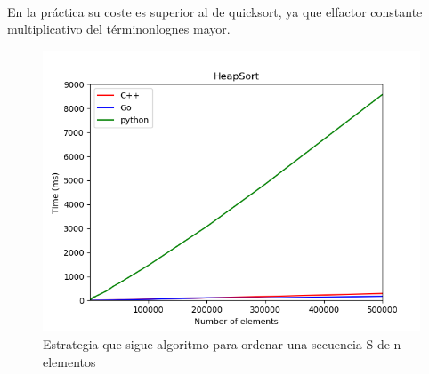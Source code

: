 \documentclass{article}
\begin{document}
        \paragraph {}
        En la práctica su coste es superior al de quicksort, ya que elfactor constante multiplicativo del términonlognes mayor.

            \begin{figure}[h!]
            \centering
            \includegraphics[width=12cm]{img/HeapSort_1.png}
            \caption{Estrategia que sigue algoritmo para ordenar una secuencia S de n elementos}
            \label{fig:heapsort}
        \end {figure}
\end{document}
